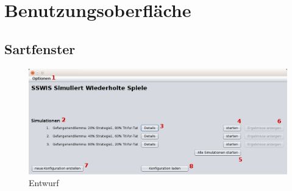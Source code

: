 \section{Benutzungsoberfläche}


\subsection{Sartfenster}

\begin{figure}[htbp] 
  \centering
     \includegraphics[width=1.2\textwidth]{GUI_Entwurf/StartfensterBeispiel.png}
  \caption{Entwurf}
  \label{fig:Bild1}
\end{figure}

